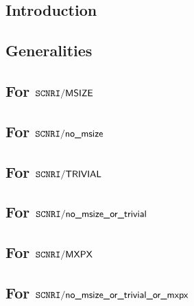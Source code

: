 \subsection{Introduction}                                          \label{mxp: computation: intro}                               
\subsection{Generalities}                                          \label{mxp: computation: generalities}                        
\subsection{For $\texttt{SCNRI}\textsf{/}{\textsf{MSIZE}}$}                               \label{mxp: computation: msize}                               
\subsection{For $\texttt{SCNRI}\textsf{/}{\textsf{no\_msize}}$}                         \label{mxp: computation: non msize}                           
\subsection{For $\texttt{SCNRI}\textsf{/}{\textsf{TRIVIAL}}$}                    \label{mxp: computation: trivial}                                                               
\subsection{For $\texttt{SCNRI}\textsf{/}{\textsf{no\_msize\_or\_trivial}}$}              \label{mxp: computation: nontrivial}                          
\subsection{For $\texttt{SCNRI}\textsf{/}{\textsf{MXPX}}$}                                \label{mxp: computation: mxpx}                                
\subsection{For $\texttt{SCNRI}\textsf{/}{\textsf{no\_msize\_or\_trivial\_or\_mxpx}}$}                \label{mxp: computation: nontrivial_unexceptional}                                                                        
